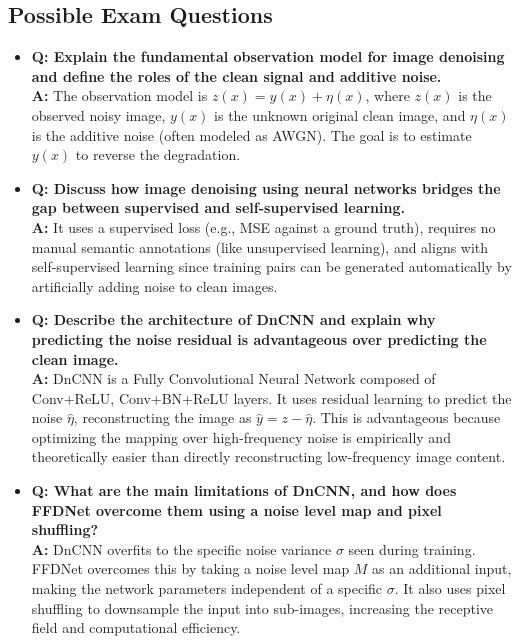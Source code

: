 \subsection{Possible Exam Questions}
\begin{itemize}
    \item \textbf{Q: Explain the fundamental observation model for image denoising and define the roles of the clean signal and additive noise.} \\
    \textbf{A:} The observation model is $z(x) = y(x) + \eta(x)$, where $z(x)$ is the observed noisy image, $y(x)$ is the unknown original clean image, and $\eta(x)$ is the additive noise (often modeled as AWGN). The goal is to estimate $y(x)$ to reverse the degradation.
    
    \item \textbf{Q: Discuss how image denoising using neural networks bridges the gap between supervised and self-supervised learning.} \\
    \textbf{A:} It uses a supervised loss (e.g., MSE against a ground truth), requires no manual semantic annotations (like unsupervised learning), and aligns with self-supervised learning since training pairs can be generated automatically by artificially adding noise to clean images.
    
    \item \textbf{Q: Describe the architecture of DnCNN and explain why predicting the noise residual is advantageous over predicting the clean image.} \\
    \textbf{A:} DnCNN is a Fully Convolutional Neural Network composed of Conv+ReLU, Conv+BN+ReLU layers. It uses residual learning to predict the noise $\hat{\eta}$, reconstructing the image as $\hat{y} = z - \hat{\eta}$. This is advantageous because optimizing the mapping over high-frequency noise is empirically and theoretically easier than directly reconstructing low-frequency image content.
    
    \item \textbf{Q: What are the main limitations of DnCNN, and how does FFDNet overcome them using a noise level map and pixel shuffling?} \\
    \textbf{A:} DnCNN overfits to the specific noise variance $\sigma$ seen during training. FFDNet overcomes this by taking a noise level map $M$ as an additional input, making the network parameters independent of a specific $\sigma$. It also uses pixel shuffling to downsample the input into sub-images, increasing the receptive field and computational efficiency.
    

\end{itemize}
